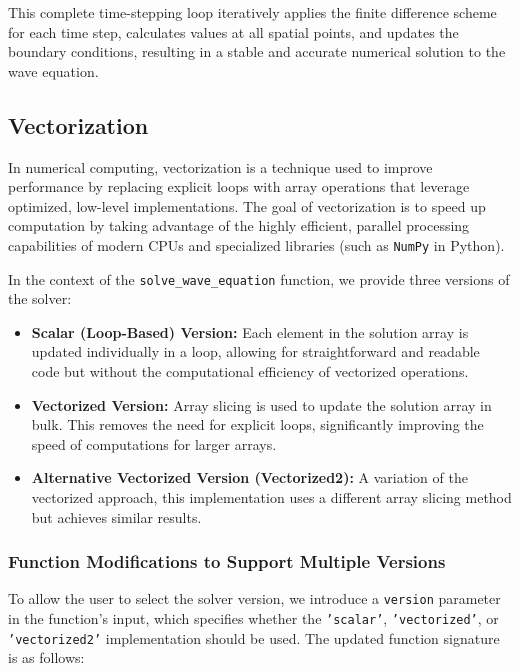 \documentclass{article}
\begin{document}
		This complete time-stepping loop iteratively applies the finite difference scheme for each time step, calculates values at all spatial points, and updates the boundary conditions, resulting in a stable and accurate numerical solution to the wave equation.
	
	
	    \subsection{Vectorization}
	    
		    In numerical computing, vectorization is a technique used to improve performance by replacing explicit loops with array operations that leverage optimized, low-level implementations. The goal of vectorization is to speed up computation by taking advantage of the highly efficient, parallel processing capabilities of modern CPUs and specialized libraries (such as \texttt{NumPy} in Python).
		    
		    In the context of the \texttt{solve\_wave\_equation} function, we provide three versions of the solver:
		    \begin{itemize}
		    	\item \textbf{Scalar (Loop-Based) Version:} Each element in the solution array is updated individually in a loop, allowing for straightforward and readable code but without the computational efficiency of vectorized operations.
		    	\item \textbf{Vectorized Version:} Array slicing is used to update the solution array in bulk. This removes the need for explicit loops, significantly improving the speed of computations for larger arrays.
		    	\item \textbf{Alternative Vectorized Version (Vectorized2):} A variation of the vectorized approach, this implementation uses a different array slicing method but achieves similar results.
		    \end{itemize}
		    
		    \subsubsection{Function Modifications to Support Multiple Versions}
		    
		    To allow the user to select the solver version, we introduce a \texttt{version} parameter in the function’s input, which specifies whether the \texttt{'scalar'}, \texttt{'vectorized'}, or \texttt{'vectorized2'} implementation should be used. The updated function signature is as follows:
		    
\end{document}
